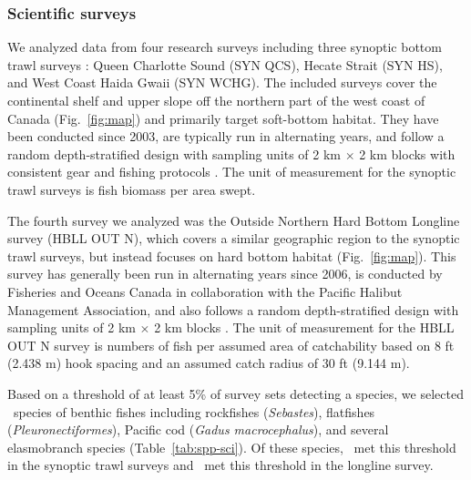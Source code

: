 \documentclass[12pt]{article}
\begin{document}
\begin{spacing}{1.4}
\subsubsection*{Scientific surveys}

We analyzed data from four research surveys including three synoptic bottom trawl surveys \citep[][Fig.~\ref{fig:map}]{sinclair2003syn, anderson2019synopsis}:
Queen Charlotte Sound (SYN QCS),
Hecate Strait (SYN HS), and
West Coast Haida Gwaii (SYN WCHG).
The included surveys cover the continental shelf and upper slope off the northern part of the west coast of Canada (Fig.~\ref{fig:map}) and primarily target soft-bottom habitat. They have been conducted since 2003, are typically run in alternating years, and follow a random depth-stratified design with sampling units of 2 km $\times$ 2 km blocks with consistent gear and fishing protocols \citep{sinclair2003syn}. The unit of measurement for the synoptic trawl surveys is fish biomass per area swept.

The fourth survey we analyzed was the Outside Northern Hard Bottom Longline survey (HBLL OUT N), which covers a similar geographic region to the synoptic trawl surveys, but instead focuses on hard bottom habitat \citep{doherty2019hbllout} (Fig.~\ref{fig:map}). This survey has generally been run in alternating years since 2006, is conducted by Fisheries and Oceans Canada in collaboration with the Pacific Halibut Management Association, and also follows a random depth-stratified design with sampling units of 2 km $\times$ 2 km blocks \citep{doherty2019hbllout, anderson2019synopsis}. The unit of measurement for the HBLL OUT N survey is numbers of fish per assumed area of catchability based on 8 ft (2.438 m) hook spacing and an assumed catch radius of 30 ft (9.144 m).

Based on a threshold of at least 5\% of survey sets detecting a species, we selected \nSpp\ species of benthic fishes including rockfishes (\textit{Sebastes}), flatfishes (\textit{Pleuronectiformes}), Pacific cod (\textit{Gadus macrocephalus}), and several elasmobranch species (Table~\ref{tab:spp-sci}). Of these species, \synNSpp\ met this threshold in the synoptic trawl surveys and \hbllNSpp\ met this threshold in the longline survey.


\end{spacing}
\end{document}
